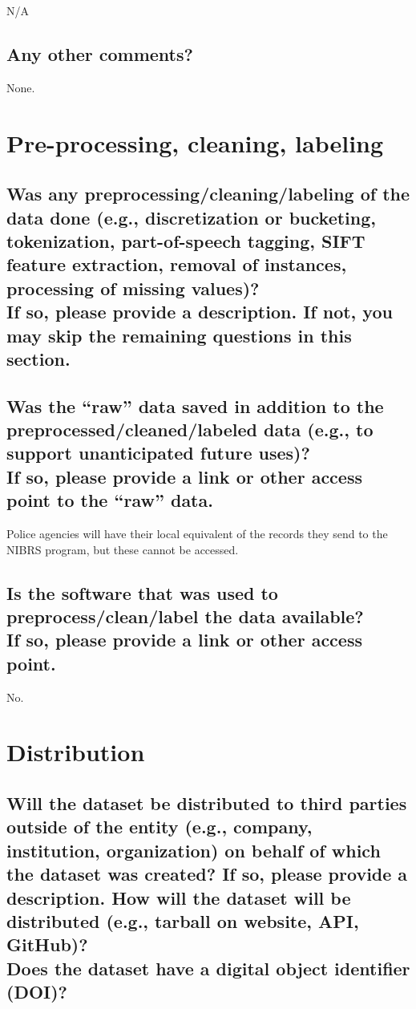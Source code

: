 \documentclass[letterpaper, 10 pt, conference]{ieeeconf}  %
\newcommand{\subtitle}[1]{{\\ \small \normalfont \color{purple} #1}}
\begin{document}
N/A

\subsection{Any other comments?}

None.

\section{Pre-processing, cleaning, labeling}

\subsection{Was any preprocessing/cleaning/labeling of the data done (e.g., discretization or bucketing, tokenization, part-of-speech tagging, SIFT feature extraction, removal of instances, processing of missing values)? \subtitle{If so, please provide a description. If not, you may skip the remaining questions in this section.}}

\lipsum[1]

\subsection{Was the “raw” data saved in addition to the preprocessed/cleaned/labeled data (e.g., to support unanticipated future uses)? \subtitle{If so, please provide a link or other access point to the “raw” data. }}

Police agencies will have their local equivalent of the records they send to the NIBRS program, but these cannot be accessed.

\subsection{Is the software that was used to preprocess/clean/label the data available? \subtitle{If so, please provide a link or other access point.}}

No.

\section{Distribution}
\subsection{Will the dataset be distributed to third parties outside of the entity (e.g., company, institution, organization) on behalf of which the dataset was created? If so, please provide a description. How will the dataset will be distributed (e.g., tarball on website, API, GitHub)? \subtitle{Does the dataset have a digital object identifier (DOI)?}}
\end{document}
